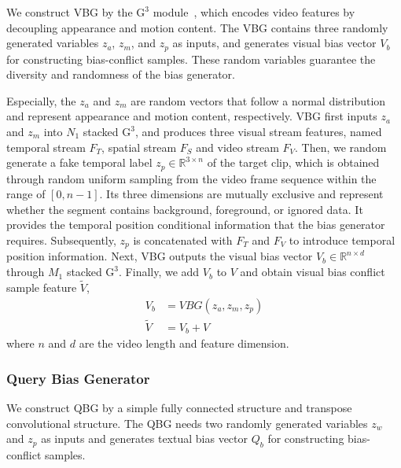 We construct VBG by the $\text{G}^\text{3}$ module~\cite{G3AN}, which encodes video features by decoupling appearance and motion content. The VBG contains three randomly generated variables $z_a$, $z_m$, and $z_p$ as inputs, and generates visual bias vector $V_{b}$ for constructing bias-conflict samples. These random variables guarantee the diversity and randomness of the bias generator.

Especially, the $z_a$ and $z_m$ are random vectors that follow a normal distribution and represent appearance and motion content, respectively. 
VBG first inputs $z_a$ and $z_m$ into $N_1$ stacked $\text{G}^\text{3}$, and produces three visual stream features, named temporal stream $F_T$, spatial stream $F_S$ and video stream $F_V$. 
Then, we random generate a fake temporal label $z_p \in \mathbb{R}^{3 \times n}$ of the target clip, which is obtained through random uniform sampling from the video frame sequence within the range of $\left[0, n-1\right]$. Its three dimensions are mutually exclusive and represent whether the segment contains background, foreground, or ignored data. It provides the temporal position conditional information that the bias generator requires. Subsequently, $z_p$ is concatenated with $F_T$ and $F_V$ to introduce temporal position information. 
Next, VBG outputs the visual bias vector $V_b\in \mathbb{R}^{n \times d}$ through $M_1$ stacked $\text{G}^\text{3}$. Finally, we add $V_b$ to $V$ and obtain visual bias conflict sample feature $\tilde{V}$,
\begin{equation}
	\begin{split}
		V_{b} &= VBG\left(z_a, z_m, z_p\right)\\
		\tilde{V} &= V_b + V
	\end{split}	
	\label{eq1}
\end{equation}
where $n$ and $d$ are the video length and feature dimension.


\subsubsection{Query Bias Generator}

We construct QBG by a simple fully connected structure and transpose convolutional structure. 
The QBG needs two randomly generated variables $z_w$ and $z_p$ as inputs and generates textual bias vector $Q_{b}$ for constructing bias-conflict samples. 

